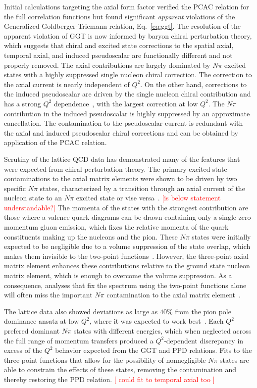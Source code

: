 Initial calculations targeting the axial form factor verified the PCAC relation
 for the full correlation functions but found significant \emph{apparent} violations
 of the Generalized Goldberger-Triemann relation, Eq.~\ref{eq:ggt}.
The resolution of the apparent violation of GGT
 is now informed by baryon chiral perturbation theory, which suggests that chiral
 and excited state corrections to the spatial axial, temporal axial, and induced pseudoscalar
 are functionally different and not properly removed.
The axial contributions are largely dominated by $N\pi$ excited states
 with a highly suppressed single nucleon chiral correction.
The correction to the axial current is nearly independent of $Q^2$.
On the other hand, corrections to the induced pseudoscalar are
 driven by the single nucleon chiral contribution and has
 a strong $Q^2$ dependence~\cite{Bar:2018xyi}, with the largest correction at low $Q^2$.
The $N\pi$ contribution in the induced pseudoscalar is highly suppressed by
 an approximate cancellation.
The contamination to the pseudoscalar current is redundant with the
 axial and induced pseudoscalar chiral corrections and can be obtained
 by application of the PCAC relation.

Scrutiny of the lattice QCD data has demonstrated many of the features
 that were expected from chiral perturbation theory.
The primary excited state contaminations to the axial matrix elements
 were shown to be driven by two specific $N\pi$ states,
 characterized by a transition through an axial current
 of the nucleon state to an $N\pi$ excited state or vise versa~\cite{Jang:2019vkm}.
\textcolor{red}{[is below statement understandable?]}
The momenta of the states with the strongest contribution are those
 where a valence quark diagrams can be drawn containing only a single
 zero-momentum gluon emission, which fixes the relative momenta of the
 quark constituents making up the nucleons and the pion.
These $N\pi$ states were initially expected to be negligible due to a volume suppression
 of the state overlap, which makes them invisible to the two-point functions~\cite{Bar:2016uoj}.
However, the three-point axial matrix element enhances these contributions relative
 to the ground state nucleon matrix element, which is enough to overcome the volume suppression.
As a consequence, analyses that fix the spectrum using the two-point functions alone
 will often miss the important $N\pi$ contamination to the
 axial matrix element~\cite{Jang:2019vkm,He:2021yvm}.

The lattice data also showed deviations as large as $40\%$ from the pion pole
 dominance ansatz at low $Q^2$, where it was expected to
 work best~\cite{Bali:2014nma,Gupta:2017dwj}.
Each $Q^2$ prefered dominant $N\pi$ states with different energies,
 which when neglected across the full range of momentum transfers
 produced a $Q^2$-dependent discrepancy in excess of the $Q^2$ behavior
 expected from the GGT and PPD relations.
Fits to the three-point functions that allow for the possibility of
 nonnegligible $N\pi$ states are able to constrain the effects of these states,
 removing the contamination and thereby restoring the PPD relation.
\textcolor{red}{[ could fit to temporal axial too ]}

